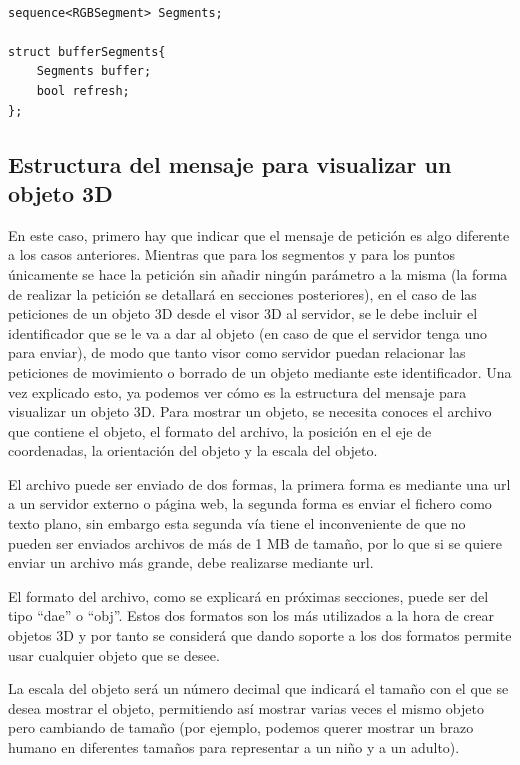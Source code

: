 \begin{lstlisting}[frame=single]
	
sequence<RGBSegment> Segments;
	
struct bufferSegments{
	Segments buffer;
	bool refresh;
};
\end{lstlisting}

\subsection{Estructura del mensaje para visualizar un objeto 3D}
En este caso, primero hay que indicar que el mensaje de petición es algo diferente a los casos anteriores. Mientras que para los segmentos y para los puntos únicamente se hace la petición sin añadir ningún parámetro a la misma (la forma de realizar la petición se detallará en secciones posteriores), en el caso de las peticiones de un objeto 3D desde el visor 3D al servidor, se le debe incluir el identificador que se le va a dar al objeto (en caso de que el servidor tenga uno para enviar), de modo que tanto visor como servidor puedan relacionar las peticiones de movimiento o borrado de un objeto mediante este identificador.
Una vez explicado esto, ya podemos ver cómo es la estructura del mensaje para visualizar un objeto 3D. Para mostrar un objeto, se necesita conoces el archivo que contiene el objeto, el formato del archivo, la posición en el eje de coordenadas, la orientación del objeto y la escala del objeto. 

El archivo puede ser enviado de dos formas, la primera forma es mediante una url a un servidor externo o página web, la segunda forma es enviar el fichero como texto plano, sin embargo esta segunda vía tiene el inconveniente de que no pueden ser enviados archivos de más de 1 MB de tamaño, por lo que si se quiere enviar un archivo más grande, debe realizarse mediante url.

El formato del archivo, como se explicará en próximas secciones, puede ser del tipo ``dae'' o ``obj''. Estos dos formatos son los más utilizados a la hora de crear objetos 3D y por tanto se considerá que dando soporte a los dos formatos permite usar cualquier objeto que se desee.

La escala del objeto será un número decimal que indicará el tamaño con el que se desea mostrar el objeto, permitiendo así mostrar varias veces el mismo objeto pero cambiando de tamaño (por ejemplo, podemos querer mostrar un brazo humano en diferentes tamaños para representar a un niño y a un adulto).

